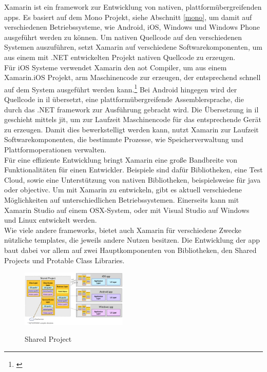 Xamarin ist ein \gls{framework} zur Entwicklung von nativen, plattformübergreifenden \glspl{app}. Es basiert auf dem Mono Projekt, siehe Abschnitt \eqref{mono}, um damit auf verschiedenen Betriebssysteme, wie Android, iOS, Windows und Windows Phone ausgeführt werden zu können. Um nativen Quellcode auf den verschiedenen Systemen auszuführen, setzt Xamarin auf verschiedene Softwarekomponenten, um aus einem mit .NET entwickelten Projekt nativen Quellcode zu erzeugen.\\
Für iOS Systeme verwendet Xamarin den \gls{aot} Compiler, um aus einem Xamarin.iOS Projekt, \gls{arm} Maschinencode zur erzeugen, der entsprechend schnell auf dem System ausgeführt werden kann.\footnote{\citep[vgl.][Introduction to Mobile Development - Xamarin]{Xamarin.Introductionto}\label{note38}} Bei Android hingegen wird der Quellcode in \gls{il} übersetzt, eine plattformübergreifende Assemblersprache, die durch das .NET \gls{framework} zur Ausführung gebracht wird. Die Übersetzung in \gls{il} geschieht mittels \gls{jit}, um zur Laufzeit Maschinencode für das entsprechende Gerät zu erzeugen. Damit dies bewerkstelligt werden kann, nutzt Xamarin zur Laufzeit Softwarekomponenten, die bestimmte Prozesse, wie Speicherverwaltung und Plattformoperationen verwalten.\\
Für eine effiziente Entwicklung bringt Xamarin eine große Bandbreite von Funktionalitäten für einen Entwickler. Beispiele sind dafür Bibliotheken, eine Test Cloud, sowie eine Unterstützung von nativen Bibliotheken, beispielsweise für \gls{java} oder \gls{objectivc}. Um mit Xamarin zu entwickeln, gibt es aktuell verschiedene Möglichkeiten auf unterschiedlichen Betriebssystemen. Einerseits kann mit Xamarin Studio auf einem OSX-System, oder mit Visual Studio auf Windows und Linux entwickelt werden.\\
Wie viele andere \glspl{framework}, bietet auch Xamarin für verschiedene Zwecke nützliche \glspl{template}, die jeweils andere Nutzen besitzen. Die Entwicklung der \gls{app} baut dabei vor allem auf zwei Hauptkomponenten von Bibliotheken, den Shared Projects und Protable Class Libraries.

\newpage
\begin{figure}
	\begin{center}
		\includegraphics[width=0.45\textwidth]{images/technische_grundlagen/SharedAssetProject.png}
	\end{center}
	\caption{Shared Project}
	\cite{Xamarin.SharedProjects}
	\label{fig:shared}
\end{figure}

